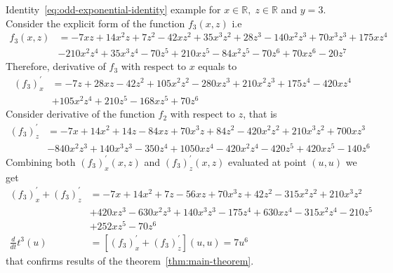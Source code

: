 \begin{example}
    \normalfont
    Identity~\eqref{eq:odd-exponential-identity} example for $x\in\mathbb{R}, \; z\in \mathbb{R}$ and $y=3$.
    Consider the explicit form of the function $f_{3} (x, z)$ i.e
    \begin{align*}
        f_3 (x, z) &= -7 x z + 14 x^2 z + 7 z^2 - 42 x z^2 + 35 x^3 z^2 + 28 z^3 -140 x^2 z^3 + 70 x^3 z^3 + 175 x z^4 \\
        &- 210 x^2 z^4 + 35 x^3 z^4 -70 z^5 + 210 x z^5 - 84 x^2 z^5 - 70 z^6 + 70 x z^6 - 20 z^7
    \end{align*}
    Therefore, derivative of $f_{3}$ with respect to $x$ equals to
    \begin{align*}
    (f_3)
        ^{'}_{x} &= -7 z + 28 x z - 42 z^2 + 105 x^2 z^2 - 280 x z^3 + 210 x^2 z^3 + 175 z^4 - 420 x z^4 \\
        &+ 105 x^2 z^4 + 210 z^5 - 168 x z^5 + 70 z^6
    \end{align*}
    Consider derivative of the function $f_2$ with respect to $z$, that is
    \begin{align*}
    (f_3)
        ^{'}_{z} &= -7 x + 14 x^2 + 14 z - 84 x z + 70 x^3 z + 84 z^2 - 420 x^2 z^2 + 210 x^3 z^2 + 700 x z^3 \\
        &- 840 x^2 z^3 + 140 x^3 z^3 - 350 z^4 + 1050 x z^4 - 420 x^2 z^4 - 420 z^5 + 420 x z^5 - 140 z^6
    \end{align*}
    Combining both $(f_3)^{'}_{x} (x, z)$ and $(f_3)^{'}_{z} (x, z)$ evaluated at point $(u, u)$ we get
    \begin{align*}
    (f_3)
        ^{'}_{x} + (f_3)^{'}_{z} &= -7 x + 14 x^2 + 7 z - 56 x z + 70 x^3 z + 42 z^2 - 315 x^2 z^2 + 210 x^3 z^2 \\
        &+ 420 x z^3 - 630 x^2 z^3 + 140 x^3 z^3 - 175 z^4 + 630 x z^4 - 315 x^2 z^4 - 210 z^5 \\
        &+ 252 x z^5 - 70 z^6 \\
        \frac{d}{dt} t^{3} (u) &= [(f_3) ^{'}_{x} + (f_3)^{'}_{z}] (u,u) = 7 u^6
    \end{align*}
    that confirms results of the theorem~\ref{thm:main-theorem}.
\end{example}